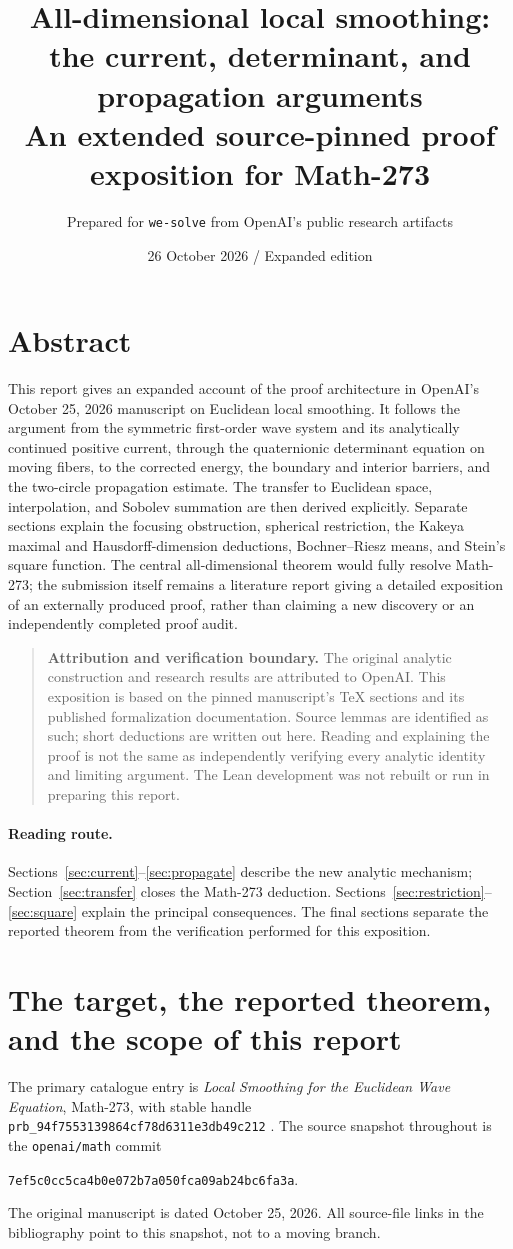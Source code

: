 \documentclass[11pt,a4paper]{article}
\title{All-dimensional local smoothing:\\the current, determinant, and propagation arguments\\
\large An extended source-pinned proof exposition for Math-273}
\author{Prepared for \texttt{we-solve} from OpenAI's public research artifacts}
\date{26 October 2026 \quad / \quad Expanded edition}
\numberwithin{equation}{section}
\theoremstyle{definition}
\theoremstyle{remark}
\newcommand{\sourcecommit}{7ef5c0cc5ca4b0e072b7a050fca09ab24bc6fa3a}
\newcommand{\pin}{\texttt{\sourcecommit}}
\newcommand{\statusbox}[1]{\begin{quote}\small\noindent\textbf{Attribution and verification boundary.} #1\end{quote}}
\begin{document}
\maketitle
\section*{Abstract}
This report gives an expanded account of the proof architecture in OpenAI's
October 25, 2026 manuscript on Euclidean local smoothing. It follows the argument
from the symmetric first-order wave system and its analytically continued
positive current, through the quaternionic determinant equation on moving
fibers, to the corrected energy, the boundary and interior barriers, and the
two-circle propagation estimate. The transfer to Euclidean space,
interpolation, and Sobolev summation are then derived explicitly. Separate
sections explain the focusing obstruction, spherical restriction, the Kakeya
maximal and Hausdorff-dimension deductions, Bochner--Riesz means, and Stein's
square function. The central all-dimensional theorem would fully resolve
Math-273; the submission itself remains a literature report giving a detailed
exposition of an externally produced proof, rather than claiming a new discovery
or an independently completed proof audit.

\statusbox{The original analytic construction and research results are attributed
to OpenAI. This exposition is based on the pinned manuscript's TeX sections and
its published formalization documentation. Source lemmas are identified as such;
short deductions are written out here. Reading and explaining the proof is not
the same as independently verifying every analytic identity and limiting
argument. The Lean development was not rebuilt or run in preparing this report.}
\paragraph{Reading route.}
Sections~\ref{sec:current}--\ref{sec:propagate} describe the new analytic
mechanism; Section~\ref{sec:transfer} closes the Math-273 deduction.
Sections~\ref{sec:restriction}--\ref{sec:square} explain the principal
consequences. The final sections separate the reported theorem from the
verification performed for this exposition.




\section{The target, the reported theorem, and the scope of this report}
\label{sec:target}
The primary catalogue entry is \emph{Local Smoothing for the Euclidean Wave
Equation}, Math-273, with stable handle
\texttt{prb\_94f7553139864cf78d6311e3db49c212} \cite{catalogue}.
The source snapshot throughout is the \texttt{openai/math} commit
\begin{center}\pin.\end{center}
The original manuscript is dated October 25, 2026. All source-file links in the
bibliography point to this snapshot, not to a moving branch.
\end{document}
